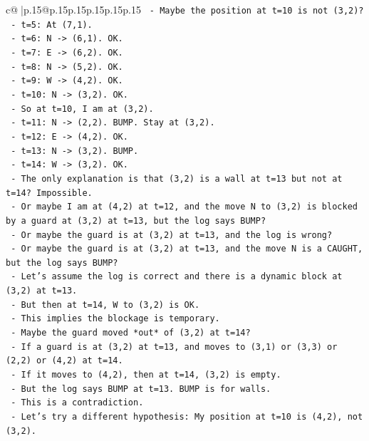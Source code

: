 \documentclass{article}
\begin{document}
{\begin{supertabular}{c@{$\;$}|p{.15\linewidth}@{}p{.15\linewidth}p{.15\linewidth}p{.15\linewidth}p{.15\linewidth}p{.15\linewidth}}
{{{\texttt{    {-} Maybe the position at t=10 is not (3,2)?} \\
\texttt{    {-} t=5: At (7,1).} \\
\texttt{    {-} t=6: N {-}> (6,1). OK.} \\
\texttt{    {-} t=7: E {-}> (6,2). OK.} \\
\texttt{    {-} t=8: N {-}> (5,2). OK.} \\
\texttt{    {-} t=9: W {-}> (4,2). OK.} \\
\texttt{    {-} t=10: N {-}> (3,2). OK.} \\
\texttt{    {-} So at t=10, I am at (3,2).} \\
\texttt{    {-} t=11: N {-}> (2,2). BUMP. Stay at (3,2).} \\
\texttt{    {-} t=12: E {-}> (4,2). OK.} \\
\texttt{    {-} t=13: N {-}> (3,2). BUMP.} \\
\texttt{    {-} t=14: W {-}> (3,2). OK.} \\
\texttt{    {-} The only explanation is that (3,2) is a wall at t=13 but not at t=14? Impossible.} \\
\texttt{    {-} Or maybe I am at (4,2) at t=12, and the move N to (3,2) is blocked by a guard at (3,2) at t=13, but the log says BUMP?} \\
\texttt{    {-} Or maybe the guard is at (3,2) at t=13, and the log is wrong?} \\
\texttt{    {-} Or maybe the guard is at (3,2) at t=13, and the move N is a CAUGHT, but the log says BUMP?} \\
\texttt{    {-} Let's assume the log is correct and there is a dynamic block at (3,2) at t=13.} \\
\texttt{    {-} But then at t=14, W to (3,2) is OK.} \\
\texttt{    {-} This implies the blockage is temporary.} \\
\texttt{    {-} Maybe the guard moved *out* of (3,2) at t=14?} \\
\texttt{    {-} If a guard is at (3,2) at t=13, and moves to (3,1) or (3,3) or (2,2) or (4,2) at t=14.} \\
\texttt{    {-} If it moves to (4,2), then at t=14, (3,2) is empty.} \\
\texttt{    {-} But the log says BUMP at t=13. BUMP is for walls.} \\
\texttt{    {-} This is a contradiction.} \\
\texttt{    {-} Let's try a different hypothesis: My position at t=10 is (4,2), not (3,2).} \\
}}}
\end{supertabular}}
\end{document}
